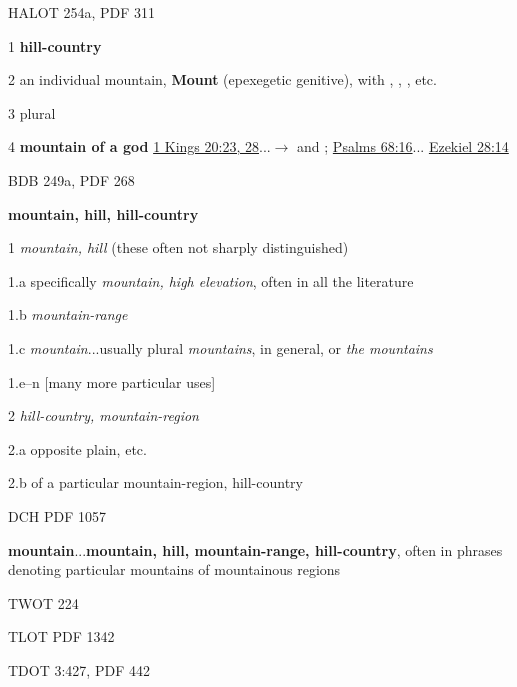 				\begin{compactdesc}
					\item[HALOT 254a, PDF 311] \textbf{} %
						\begin{compactitem}
							\item[1] \textbf{hill-country}
							\item[2] an individual mountain, \textbf{Mount}  (epexegetic genitive), with , , , etc.
							\item[3] plural 
							\item[4] \textbf{mountain of a god}  \hyperref[1KINGS-20-23]{1 Kings 20:23, 28}...$\rightarrow$  and ;  \hyperref[PSALMS-68-16]{Psalms 68:16}... \hyperref[EZEKIEL-28-14]{Ezekiel 28:14}
						\end{compactitem}
					\item[BDB 249a, PDF 268] \textbf{}
						\begin{compactitem}
							\item \textbf{mountain, hill, hill-country}
							\item[1] \textit{mountain, hill} (these often not sharply distinguished)
							\item[1.a] specifically \textit{mountain, high elevation}, often in all the literature
							\item[1.b] \textit{mountain-range}
							\item[1.c] \textit{mountain}...usually plural \textit{mountains}, in general, or \textit{the mountains}
							\item[1.e--n] [many more particular uses]
							\item[2] \textit{hill-country, mountain-region}
							\item[2.a] opposite plain, etc.
							\item[2.b] of a particular mountain-region, hill-country
						\end{compactitem}
					\item[DCH PDF 1057] \textbf{} %
						\begin{compactitem}
							\item \textbf{mountain}...\textbf{mountain, hill, mountain-range, hill-country}, often in phrases denoting particular mountains of mountainous regions
						\end{compactitem}
					\item[TWOT 224]
					\item[TLOT PDF 1342]
					\item[TDOT 3:427, PDF 442]
				\end{compactdesc}
				
